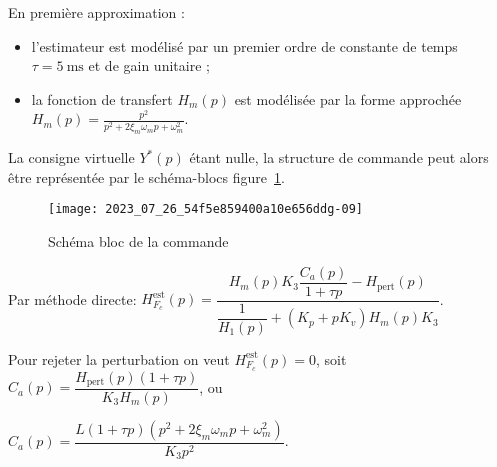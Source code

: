 En première approximation :
\begin{itemize}
\item l'estimateur est modélisé par un premier ordre de constante de temps $\tau=5 \mathrm{~ms}$ et de gain unitaire ;
  \item la fonction de transfert $H_{m}(p)$ est modélisée par la forme approchée $H_{m}(p)=\frac{p^{2}}{p^{2}+2 \xi_{m} \omega_{m} p+\omega_{m}^{2}}$.
\end{itemize}

La consigne virtuelle $Y^{*}(p)$ étant nulle, la structure de commande peut alors être représentée par le schéma-blocs figure~\ref{fig_ccspsi2022:15}.

\begin{figure}[!h]
\centering
\texttt{[image: 2023\_07\_26\_54f5e859400a10e656ddg-09]}
\caption{\label{fig_ccspsi2022:15}Schéma bloc de la commande}
\end{figure}

\ifprof
\begin{corrige}
Par méthode directe:
$ \boxed{H_{F_c}^{\text{est}}(p) = \dfrac{H_m(p) K_3 \dfrac{C_a(p)}{1+\tau p} - H_{\text{pert}}(p)}{\dfrac{1}{H_1(p)} + (K_p + p K_v)H_m(p) K_3}} $.
\end{corrige}
\else
\fi

\ifprof
\begin{corrige}
Pour rejeter la perturbation on veut $H_{F_c}^{\text{est}}(p) = 0$, soit $\boxed{C_a(p) = \dfrac{H_{\text{pert}}(p)(1+\tau p)}{K_3 H_m(p)}}$, ou 

$\boxed{C_a(p) = \dfrac{L(1+\tau p)(p^2 + 2\xi_m \omega_m p + \omega_m^2)}{K_3 p^2}}$.
\end{corrige}
\else
\fi


